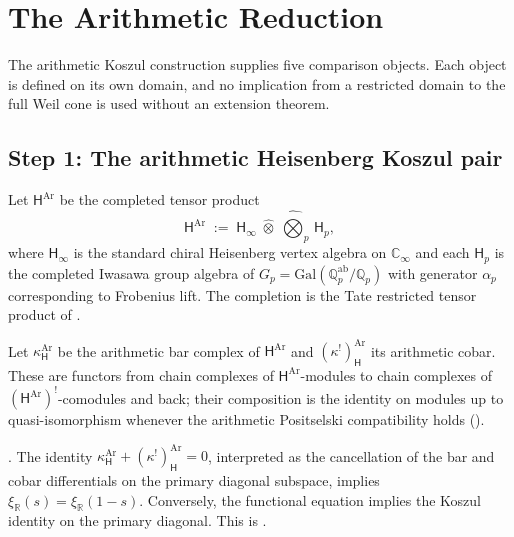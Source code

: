 \section{The Arithmetic Reduction}
\label{v4-arith:w5-direct:programme-elementary}

The arithmetic Koszul construction supplies five comparison objects.
Each object is defined on its own domain, and no implication from a
restricted domain to the full Weil cone is used without an extension
theorem.

\subsection{Step 1: The arithmetic Heisenberg Koszul pair}
\label{v4-arith:w5-direct:step-1}

\begin{definition}
\label{v4-arith:w5-direct:def:heisenberg}
Let \(\mathsf{H}^{\mathrm{Ar}}\) be the completed tensor product
\begin{equation}
\label{v4-arith:w5-direct:eq:heis}
\mathsf{H}^{\mathrm{Ar}}\;:=\;
\mathsf{H}_{\infty}\;\widehat\otimes\;\widehat\bigotimes_{p}\,\mathsf{H}_{p},
\end{equation}
where \(\mathsf{H}_{\infty}\) is the standard chiral Heisenberg vertex
algebra on \(\mathbb{C}_{\infty}\) and each \(\mathsf{H}_{p}\) is the
completed Iwasawa group algebra of \(G_{p}=\mathrm{Gal}(\mathbb{Q}_{p}^{\mathrm{ab}}/\mathbb{Q}_{p})\)
with generator \(\alpha_{p}\) corresponding to Frobenius lift. The
completion is the Tate restricted tensor product of
.
\end{definition}

\begin{definition}
\label{v4-arith:w5-direct:def:koszul}
Let \(\kappa^{\mathrm{Ar}}_{\mathsf{H}}\) be the arithmetic bar complex of
\(\mathsf{H}^{\mathrm{Ar}}\) and \((\kappa^{!})^{\mathrm{Ar}}_{\mathsf{H}}\)
its arithmetic cobar. These are functors from chain complexes of
\(\mathsf{H}^{\mathrm{Ar}}\)-modules to chain complexes of
\((\mathsf{H}^{\mathrm{Ar}})^{!}\)-comodules and back; their composition
is the identity on modules up to quasi-isomorphism whenever the
arithmetic Positselski compatibility holds
().
\end{definition}

\begin{theorem}
\label{v4-arith:w5-direct:thm:P1-elementary}
\ClaimStatusProvedHere. The identity
\(\kappa^{\mathrm{Ar}}_{\mathsf{H}}+(\kappa^{!})^{\mathrm{Ar}}_{\mathsf{H}}=0\),
interpreted as the cancellation of the bar and cobar differentials on
the primary diagonal subspace, implies
\(\xi_{\mathbb{R}}(s)=\xi_{\mathbb{R}}(1-s)\).
Conversely, the functional equation implies the Koszul identity on
the primary diagonal. This is
.
\end{theorem}

